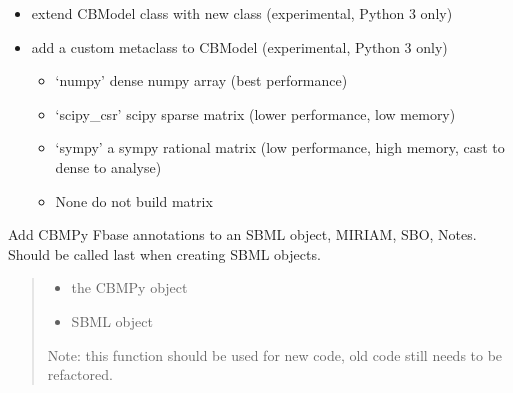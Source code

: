 \documentclass[letterpaper,10pt,english]{sphinxmanual}
\begin{document}
\begin{fulllineitems}
\begin{itemize}
\begin{itemize}
\item {} 
\sphinxAtStartPar
{} extend CBModel class with new class (experimental, Python 3 only)

\item {} 
\sphinxAtStartPar
{} add a custom metaclass to CBModel (experimental, Python 3 only)
\begin{itemize}
\item {} 
\sphinxAtStartPar
‘numpy’ dense numpy array (best performance)

\item {} 
\sphinxAtStartPar
‘scipy\_csr’ scipy sparse matrix (lower performance, low memory)

\item {} 
\sphinxAtStartPar
‘sympy’ a sympy rational matrix (low performance, high memory, cast to dense to analyse)

\item {} 
\sphinxAtStartPar
None do not build matrix

\end{itemize}

\end{itemize}

\end{itemize}

\end{fulllineitems}


\begin{fulllineitems}
\label{\detokenize{modules_doc:cbmpy.CBXML.sbml_setAnnotationsL3Fbc}}
\pysigstartsignatures
{}
\pysigstopsignatures
\sphinxAtStartPar
Add CBMPy Fbase annotations to an SBML object, MIRIAM, SBO, Notes. Should
be called last when creating SBML objects.
\begin{quote}
\begin{itemize}
\item {} 
\sphinxAtStartPar
{} the CBMPy object

\item {} 
\sphinxAtStartPar
{} SBML object

\end{itemize}

\sphinxAtStartPar
Note: this function should be used for new code, old code still needs to be
refactored.
\end{quote}

\end{fulllineitems}
\end{document}
